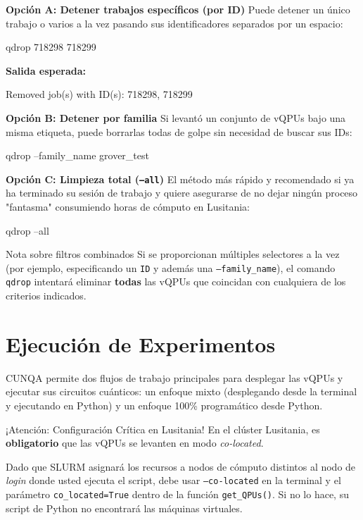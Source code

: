 \documentclass[a4paper,11pt]{article}
\begin{document}
\textbf{Opción A: Detener trabajos específicos (por ID)}
Puede detener un único trabajo o varios a la vez pasando sus identificadores separados por un espacio:
\begin{terminal}
qdrop 718298 718299
\end{terminal}

\textbf{Salida esperada:}
\begin{terminal}[listing options={columns=fixed, basicstyle=\color{gray!80}\ttfamily\small, literate={}}]
Removed job(s) with ID(s): 718298, 718299
\end{terminal}

\vspace{0.3cm}
\textbf{Opción B: Detener por familia}
Si levantó un conjunto de vQPUs bajo una misma etiqueta, puede borrarlas todas de golpe sin necesidad de buscar sus IDs:
\begin{terminal}
qdrop --family_name grover_test
\end{terminal}

\vspace{0.3cm}
\textbf{Opción C: Limpieza total (\texttt{--all})}
El método más rápido y recomendado si ya ha terminado su sesión de trabajo y quiere asegurarse de no dejar ningún proceso "fantasma" consumiendo horas de cómputo en Lusitania:
\begin{terminal}
qdrop --all
\end{terminal}

\begin{infobox}{Nota sobre filtros combinados}
Si se proporcionan múltiples selectores a la vez (por ejemplo, especificando un \texttt{ID} y además una \texttt{--family\_name}), el comando \texttt{qdrop} intentará eliminar \textbf{todas} las vQPUs que coincidan con cualquiera de los criterios indicados.
\end{infobox}
\section{Ejecución de Experimentos}

CUNQA permite dos flujos de trabajo principales para desplegar las vQPUs y ejecutar sus circuitos cuánticos: un enfoque mixto (desplegando desde la terminal y ejecutando en Python) y un enfoque 100\% programático desde Python.

\begin{infobox}{¡Atención: Configuración Crítica en Lusitania!}
En el clúster Lusitania, es \textbf{obligatorio} que las vQPUs se levanten en modo \textit{co-located}. 

Dado que SLURM asignará los recursos a nodos de cómputo distintos al nodo de \textit{login} donde usted ejecuta el script, debe usar \texttt{--co-located} en la terminal y el parámetro \texttt{co\_located=True} dentro de la función \texttt{get\_QPUs()}. Si no lo hace, su script de Python no encontrará las máquinas virtuales.
\end{infobox}
\end{document}
